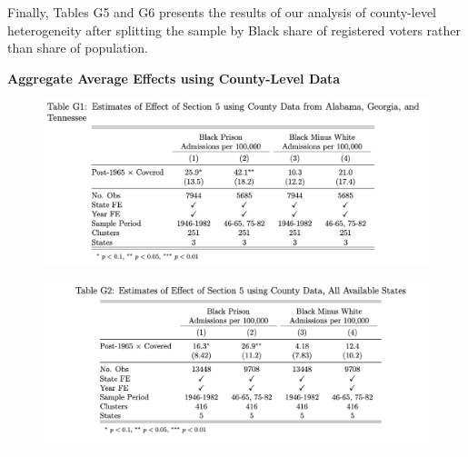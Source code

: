 \documentclass[12pt]{article}
\begin{document}
Finally, Tables G5 and G6 presents the results of our analysis of county-level heterogeneity after splitting the sample by Black share of registered voters rather than share of population.

\vspace*{.1in}
\textbf{Aggregate Average Effects using County-Level Data}

\begin{figure}
	\centering
	\includegraphics[width=\textwidth]{../../60_appendix_cty_results/table_g1.png}
\end{figure}


\begin{figure}
	\centering
	\includegraphics[width=\textwidth]{../../60_appendix_cty_results/table_g2.png}
\end{figure}

\end{document}

